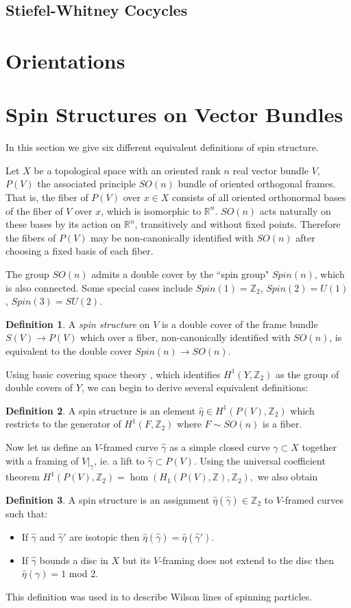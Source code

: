 \documentclass{article}
\def\bZ{\mathbb{Z}}
\def\bR{\mathbb{R}}
\theoremstyle{definition}
\newtheorem{defn}{Definition}
\begin{document}
\subsection{Stiefel-Whitney Cocycles}

\section{Orientations}

\section{Spin Structures on Vector Bundles}

In this section we give six different equivalent definitions of spin structure.

Let $X$ be a topological space with an oriented rank $n$ real vector bundle $V$, $P(V)$ the associated principle $SO(n)$ bundle of oriented orthogonal frames. That is, the fiber of $P(V)$ over $x \in X$ consists of all oriented orthonormal bases of the fiber of $V$ over $x$, which is isomorphic to $\bR^n$. $SO(n)$ acts naturally on these bases by its action on $\bR^n$, transitively and without fixed points. Therefore the fibers of $P(V)$ may be non-canonically identified with $SO(n)$ after choosing a fixed basis of each fiber.

The group $SO(n)$ admits a double cover by the ``spin group" $Spin(n)$, which is also connected. Some special cases include $Spin(1) = \bZ_2$, $Spin(2) = U(1)$, $Spin(3) = SU(2)$. 
\begin{defn}
A \emph{spin structure} on $V$ is a double cover of the frame bundle $S(V) \to P(V)$ which over a fiber, non-canonically identified with $SO(n)$, is equivalent to the double cover $Spin(n) \to SO(n)$.
\end{defn}
Using basic covering space theory \cite{Hatcher}, which identifies $H^1(Y,\bZ_2)$ as the group of double covers of $Y$, we can begin to derive several equivalent definitions:
\begin{defn}
A spin structure is an element $\hat \eta \in H^1(P(V),\bZ_2)$ which restricts to the generator of $H^1(F,\bZ_2)$ where $F \sim SO(n)$ is a fiber.
\end{defn}
Now let us define an $V$-framed curve $\hat\gamma$ as a simple closed curve $\gamma \subset X$ together with a framing of $V|_\gamma$, ie. a lift to $\hat \gamma \subset P(V)$. Using the universal coefficient theorem $H^1(P(V),\bZ_2) = \hom(H_1(P(V),\bZ),\bZ_2),$ we also obtain
\begin{defn}
A spin structure is an assignment $\hat \eta(\hat\gamma) \in \bZ_2$ to $V$-framed curves such that:
\begin{itemize}
    \item If $\hat\gamma$ and $\hat\gamma'$ are isotopic then $\hat \eta(\hat \gamma) = \hat \eta(\hat \gamma')$.
    \item If $\hat\gamma$ bounds a disc in $X$ but its $V$-framing does not extend to the disc then $\hat \eta(\gamma) = 1$ mod 2.
\end{itemize}
\end{defn}
This definition was used in \cite{wilsonlines} to describe Wilson lines of spinning particles.
\end{document}
